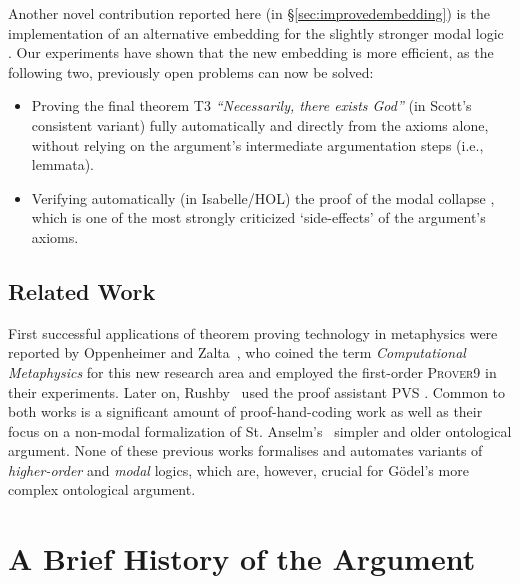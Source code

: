 \documentclass{article}
\begin{document}
Another novel contribution reported here (in \S\ref{sec:improvedembedding}) is
the implementation of an alternative embedding for the slightly
stronger modal logic \SFiveU. Our experiments have shown that the new
embedding is more efficient, as the following two, previously open problems can now be solved:
\begin{itemize}
\item Proving the final theorem T3 \textit{``Necessarily, there
    exists God''} (in Scott's  consistent variant) fully automatically and directly from the axioms
  alone, without relying on the argument's intermediate argumentation
  steps (i.e., lemmata). 
\item Verifying automatically (in Isabelle/HOL) the proof of the modal
  collapse \cite{Sobel}, which is one of the most strongly criticized
  `side-effects' of the argument's axioms.
\end{itemize}


\subsection{Related Work}

First successful applications of theorem proving technology in
metaphysics were reported by Oppenheimer and
Zalta~, who coined the term \textit{Computational Metaphysics} for this new research area and employed the first-order
\textsc{Prover9} \cite{prover9-mace4} in their experiments. Later on, Rushby~ used the proof assistant \textsc{PVS} \cite{cade92-pvs}. Common to both
works is a significant amount of proof-hand-coding work as well as their
focus on a non-modal formalization of St. Anselm's~ simpler 
and older ontological argument. 
None of these previous works formalises and automates variants of \emph{higher-order} and \emph{modal} logics, which are, however, crucial
for G\"{o}del's more complex ontological argument.


\section{A Brief History of the Argument}\label{sec:history}
\end{document}
